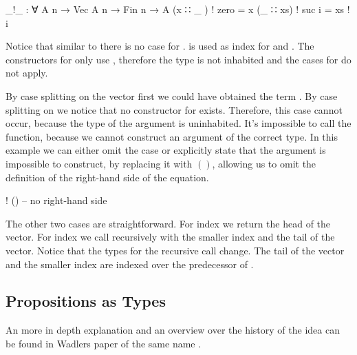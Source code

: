\documentclass[10pt,a4paper,twoside]{report}
\begin{document}
\begin{AgdaAlign}
\begin{code}
_!_ : ∀ {A n} → Vec A n → Fin n → A
(x  ∷ _ )  ! zero   = x
(_  ∷ xs)  ! suc i  = xs ! i
\end{code}
Notice that similar to  there is no case for
\AgdaInductiveConstructor{[]}.
 is used as index for
\AgdaSpace{} and .
The constructors for  only use ,
therefore the type \AgdaSpace{}
is not inhabited and the cases for \AgdaInductiveConstructor{[]} do not apply.

By case splitting on the vector first we could have obtained the term
\AgdaInductiveConstructor{[]}\AgdaSpace{}\AgdaFunction{!}.
By case splitting on  we notice that no constructor for
 exists.
Therefore, this case cannot occur, because the type of the argument is
uninhabited.
It's impossible to call the function, because we cannot construct an argument of
the correct type.
In this example we can either omit the case or explicitly state that the
argument is impossible to construct, by replacing it with $()$, allowing us to
omit the definition of the right-hand side of the equation.

\begin{code}
[]         ! () -- no right-hand side
\end{code}
\end{AgdaAlign}
The other two cases are straightforward.
For index  we return the head of the vector.
For index \AgdaSpace{} we call
\AgdaFunction{\_!\_} recursively with the smaller index and the tail of the
vector.
Notice that the types for the recursive call change.
The tail of the vector  and the smaller index 
are indexed over the predecessor of .

\subsection{Propositions as Types}

An more in depth explanation and an overview over the history of the idea can be
found in Wadlers paper of the same name \cite{DBLP:journals/cacm/Wadler15}.
\end{document}
